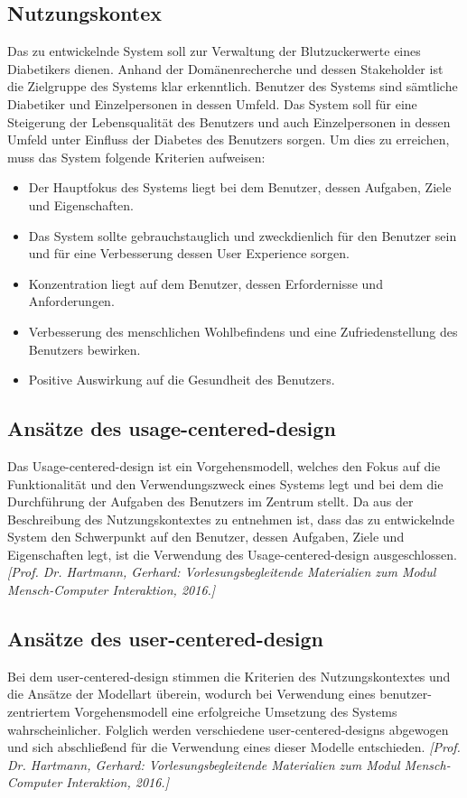 \documentclass[a4paper,11pt]{article}%
\renewcommand{\\}{\vspace*{0.5\baselineskip} \newline}
\begin{document}
	\subsection{Nutzungskontex}
	Das zu entwickelnde System soll zur Verwaltung der Blutzuckerwerte eines Diabetikers dienen. Anhand der Domänenrecherche und dessen Stakeholder ist die Zielgruppe des Systems klar erkenntlich. Benutzer des Systems sind sämtliche Diabetiker und Einzelpersonen in dessen Umfeld. Das System soll für eine Steigerung der Lebensqualität des Benutzers und auch Einzelpersonen in dessen Umfeld unter Einfluss der Diabetes des Benutzers sorgen. Um dies zu erreichen, muss das System folgende Kriterien aufweisen:
	\begin{itemize}
		\item Der Hauptfokus des Systems liegt bei dem Benutzer, dessen Aufgaben, Ziele und Eigenschaften.
		\item Das System sollte gebrauchstauglich und zweckdienlich für den Benutzer sein und für eine Verbesserung dessen User Experience sorgen.
		\item Konzentration liegt auf dem Benutzer, dessen Erfordernisse und Anforderungen.
		\item Verbesserung des menschlichen Wohlbefindens und eine Zufriedenstellung des Benutzers bewirken.
		\item Positive Auswirkung auf die Gesundheit des Benutzers.
	\end{itemize}
	\subsection{Ansätze des usage-centered-design}
	Das Usage-centered-design ist ein Vorgehensmodell, welches den Fokus auf die Funktionalität und den Verwendungszweck eines Systems legt und bei dem die Durchführung der Aufgaben des Benutzers im Zentrum stellt. Da aus der Beschreibung des Nutzungskontextes zu entnehmen ist, dass das zu entwickelnde System den Schwerpunkt auf den Benutzer, dessen Aufgaben, Ziele und Eigenschaften legt, ist die Verwendung des Usage-centered-design ausgeschlossen. \emph{[Prof. Dr. Hartmann, Gerhard: Vorlesungsbegleitende Materialien zum Modul Mensch-Computer Interaktion, 2016.]}
	\subsection{Ansätze des user-centered-design}
	Bei dem user-centered-design stimmen die Kriterien des Nutzungskontextes und die Ansätze der Modellart überein, wodurch bei Verwendung eines benutzer-zentriertem Vorgehensmodell eine erfolgreiche Umsetzung des Systems wahrscheinlicher. Folglich werden verschiedene user-centered-designs abgewogen und sich abschließend für die Verwendung eines dieser Modelle entschieden. \emph{[Prof. Dr. Hartmann, Gerhard: Vorlesungsbegleitende Materialien zum Modul Mensch-Computer Interaktion, 2016.]}
\end{document}
